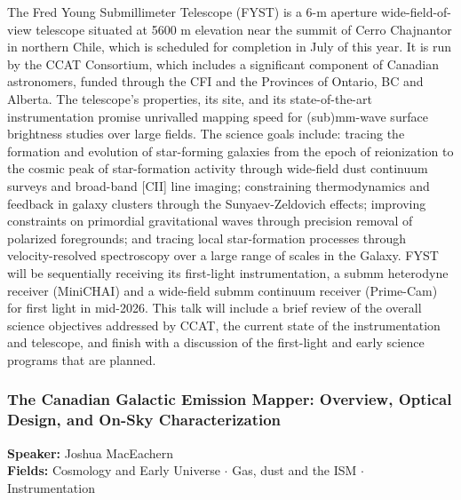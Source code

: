 The Fred Young Submillimeter Telescope (FYST) is a 6-m aperture wide-field-of-view telescope situated at 5600 m elevation near the summit of Cerro Chajnantor in northern Chile, which is scheduled for completion in July of this year. It is run by the CCAT Consortium, which includes a significant component of Canadian astronomers, funded through the CFI and the Provinces of Ontario, BC and Alberta. The telescope's properties, its site, and its state-of-the-art instrumentation promise unrivalled mapping speed for (sub)mm-wave surface brightness studies over large fields. The science goals include: tracing the formation and evolution of star-forming galaxies from the epoch of reionization to the cosmic peak of star-formation activity through wide-field dust continuum surveys and broad-band [CII] line imaging; constraining thermodynamics and feedback in galaxy clusters through the Sunyaev-Zeldovich effects; improving constraints on primordial gravitational waves through precision removal of polarized foregrounds; and tracing local star-formation processes through velocity-resolved spectroscopy over a large range of scales in the Galaxy. FYST will be sequentially receiving its first-light instrumentation, a submm heterodyne receiver (MiniCHAI) and a wide-field submm continuum receiver (Prime-Cam) for first light in mid-2026. This talk will include a brief review of the overall science objectives addressed by CCAT, the current state of the instrumentation and telescope, and finish with a discussion of the first-light and early science programs that are planned.

\hypertarget{abstract-talk-290}{}\label{abstract-page-talk-290}
\subsubsection*{The Canadian Galactic Emission Mapper: Overview, Optical Design, and On-Sky Characterization}
\textbf{Speaker:} Joshua MacEachern\\
\textbf{Fields:} Cosmology and Early Universe $\cdot$ Gas, dust and the ISM $\cdot$ Instrumentation

